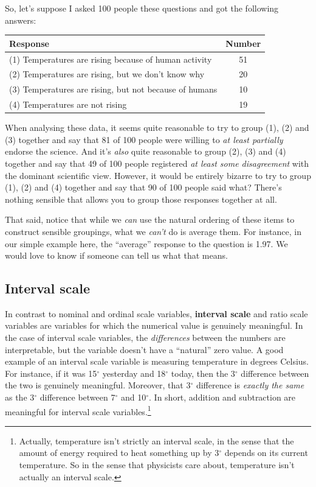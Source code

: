 \documentclass[
]{book}
\theoremstyle{definition}
\theoremstyle{definition}
\theoremstyle{definition}
\theoremstyle{definition}
\theoremstyle{remark}
\begin{document}
So, let's suppose I asked 100 people these questions and got the following answers:

\begin{table}[H]
\centering
\begin{tabular}{lc}
\toprule
Response & Number\\
\midrule
(1) Temperatures are rising because of human activity & 51\\
(2) Temperatures are rising, but we don't know why & 20\\
(3) Temperatures are rising, but not because of humans & 10\\
(4) Temperatures are not rising & 19\\
\bottomrule
\end{tabular}
\end{table}

When analysing these data, it seems quite reasonable to try to group (1), (2) and (3) together and say that 81 of 100 people were willing to \emph{at least partially} endorse the science. And it's \emph{also} quite reasonable to group (2), (3) and (4) together and say that 49 of 100 people registered \emph{at least some disagreement} with the dominant scientific view. However, it would be entirely bizarre to try to group (1), (2) and (4) together and say that 90 of 100 people said what? There's nothing sensible that allows you to group those responses together at all.

That said, notice that while we \emph{can} use the natural ordering of these items to construct sensible groupings, what we \emph{can't} do is average them. For instance, in our simple example here, the ``average'' response to the question is 1.97. We would love to know if someone can tell us what that means.

\hypertarget{intervalscale}{%
\subsection{Interval scale}\label{intervalscale}}

In contrast to nominal and ordinal scale variables, \textbf{interval scale} and ratio scale variables are variables for which the numerical value is genuinely meaningful. In the case of interval scale variables, the \emph{differences} between the numbers are interpretable, but the variable doesn't have a ``natural'' zero value. A good example of an interval scale variable is measuring temperature in degrees Celsius. For instance, if it was 15\(^\circ\) yesterday and 18\(^\circ\) today, then the 3\(^\circ\) difference between the two is genuinely meaningful. Moreover, that 3\(^\circ\) difference is \emph{exactly the same} as the 3\(^\circ\) difference between 7\(^\circ\) and 10\(^\circ\). In short, addition and subtraction are meaningful for interval scale variables.\footnote{Actually, temperature isn't strictly an interval scale, in the sense that the amount of energy required to heat something up by 3\(^\circ\) depends on its current temperature. So in the sense that physicists care about, temperature isn't actually an interval scale.}
\end{document}

